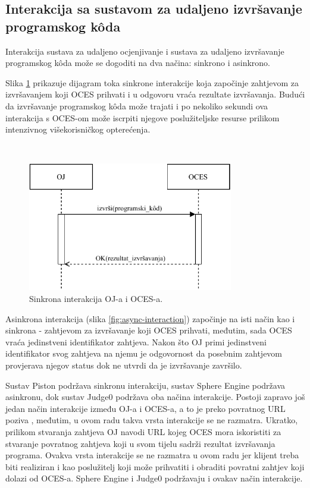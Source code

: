 \documentclass[times, utf8, diplomski]{fer}
\begin{document}
\pagebreak

\subsection{Interakcija sa sustavom za udaljeno izvršavanje programskog kôda}
\label{subsec:interaction}
Interakcija sustava za udaljeno ocjenjivanje i sustava za udaljeno izvršavanje programskog kôda može se dogoditi na dva načina: sinkrono i asinkrono.

Slika \ref{fig:sync-interaction} prikazuje dijagram toka sinkrone interakcije koja započinje zahtjevom za izvršavanjem koji OCES prihvati i u odgovoru vraća rezultate izvršavanja. Budući da izvršavanje programskog kôda može trajati i po nekoliko sekundi ova interakcija s OCES-om može iscrpiti njegove poslužiteljske resurse prilikom intenzivnog višekorisničkog opterećenja.

\

\begin{figure}[htb]
	\centering
	\includegraphics[width=0.8\textwidth]{images/Sync Interakcija.pdf}
	\caption{
		Sinkrona interakcija OJ-a i OCES-a.
	}
	\label{fig:sync-interaction}
\end{figure}

Asinkrona interakcija (slika \ref{fig:async-interaction}) započinje na isti način kao i sinkrona - zahtjevom za izvršavanje koji OCES prihvati, međutim, sada OCES vraća jedinstveni identifikator zahtjeva. Nakon što OJ primi jedinstveni identifikator svog zahtjeva na njemu je odgovornost da posebnim zahtjevom provjerava njegov status dok ne utvrdi da je izvršavanje završilo.

Sustav Piston podržava sinkronu interakciju, sustav Sphere Engine podržava asinkronu, dok sustav Judge0 podržava oba načina interakcije. Postoji zapravo još jedan način interakcije između OJ-a i OCES-a, a to je preko povratnog URL poziva , međutim, u ovom radu takva vrsta interakcije se ne razmatra. Ukratko, prilikom stvaranja zahtjeva OJ navodi URL kojeg OCES mora iskoristiti za stvaranje povratnog zahtjeva koji u svom tijelu  sadrži rezultat izvršavanja programa. Ovakva vrsta interakcije se ne razmatra u ovom radu jer klijent treba biti realiziran i kao poslužitelj koji može prihvatiti i obraditi povratni zahtjev koji dolazi od OCES-a. Sphere Engine i Judge0 podržavaju i ovakav način interakcije.
\end{document}
